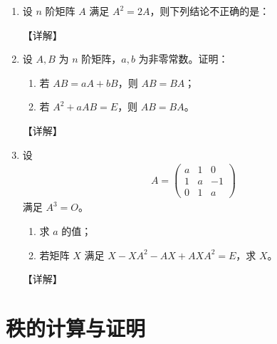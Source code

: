 \documentclass[12pt, a4paper, oneside, UTF8]{ctexbook}
\begin{document}
\begin{enumerate}[label=\arabic*.,start=3]
    \item 设 $ n $ 阶矩阵 $ A $ 满足 $ A^2 = 2A $，则下列结论不正确的是：
    
    \begin{solution}
    【详解】
    \end{solution}
    
    \item 设 $ A, B $ 为 $ n $ 阶矩阵，$ a, b $ 为非零常数。证明：
    \begin{enumerate}
        \item 若 $ AB = aA + bB $，则 $ AB = BA $；
        \item 若 $ A^2 + aAB = E $，则 $ AB = BA $。
    \end{enumerate}
    
    \begin{solution}
    【详解】
    \end{solution}
    
    \item 设 
    \begin{align*}
    A = \begin{pmatrix}
    a & 1 & 0 \\
    1 & a & -1 \\
    0 & 1 & a
    \end{pmatrix}
    \end{align*}
    满足 $ A^3 = O $。
    \begin{enumerate}
        \item 求 $ a $ 的值；
        \item 若矩阵 $ X $ 满足 $ X - XA^2 - AX + AXA^2 = E $，求 $ X $。
    \end{enumerate}
    
    \begin{solution}
    【详解】
    \end{solution}
\end{enumerate}

\section{秩的计算与证明}
\end{document}
